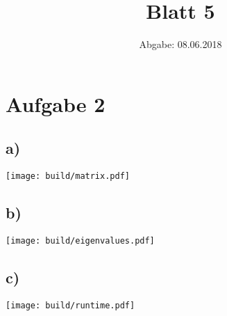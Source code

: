 

\title{Blatt 5}
\date{
  Abgabe: 08.06.2018
}



\parindent0mm
\section*{Aufgabe 2}
\subsection*{a)}
\texttt{[image: build/matrix.pdf]}
\subsection*{b)}
\texttt{[image: build/eigenvalues.pdf]}
\subsection*{c)}
\texttt{[image: build/runtime.pdf]}



